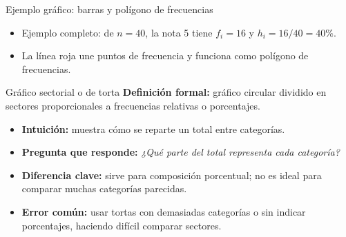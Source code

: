 \documentclass[aspectratio=169,11pt]{beamer}
\newcommand{\pregunta}[1]{\textbf{Pregunta que responde:} \emph{#1}}
\newcommand{\errorcomun}[1]{\textbf{Error común:} #1}
\newcommand{\diferencia}[1]{\textbf{Diferencia clave:} #1}
\begin{document}
\begin{frame}{Ejemplo gráfico: barras y polígono de frecuencias}
\centering
{}
\vspace{0.4em}
\begin{itemize}
  \item Ejemplo completo: de $n=40$, la nota 5 tiene $f_i=16$ y $h_i=16/40=40\%$.
  \item La línea roja une puntos de frecuencia y funciona como polígono de frecuencias.
\end{itemize}
\end{frame}

\begin{frame}{Gráfico sectorial o de torta}
\textbf{Definición formal:} gráfico circular dividido en sectores proporcionales a frecuencias relativas o porcentajes.
\begin{itemize}
  \item \textbf{Intuición:} muestra cómo se reparte un total entre categorías.
  \item \pregunta{¿Qué parte del total representa cada categoría?}
  \item \diferencia{sirve para composición porcentual; no es ideal para comparar muchas categorías parecidas.}
  \item \errorcomun{usar tortas con demasiadas categorías o sin indicar porcentajes, haciendo difícil comparar sectores.}
\end{itemize}
\end{frame}
\end{document}
